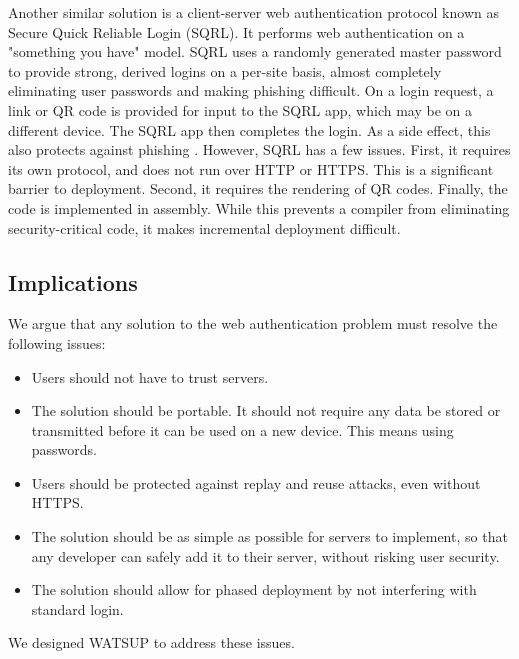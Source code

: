 Another similar solution is a client-server web authentication protocol known as Secure Quick Reliable Login (SQRL). It performs web authentication on a "something you have" model. SQRL uses a randomly generated master password to provide strong, derived logins on a per-site basis, almost completely eliminating user passwords and making phishing difficult. On a login request, a link or QR code is provided for input to the SQRL app, which may be on a different device. The SQRL app then completes the login. As a side effect, this also protects against phishing \cite{Gibson:2016}. However, SQRL has a few issues. First, it requires its own protocol, and does not run over HTTP or HTTPS. This is a significant barrier to deployment. Second, it requires the rendering of QR codes. Finally, the code is implemented in assembly. While this prevents a compiler from eliminating security-critical code, it makes incremental deployment difficult.

\subsection{Implications}
We argue that any solution to the web authentication problem must resolve the following issues:

\begin{itemize}

    \item Users should not have to trust servers.

    \item The solution should be portable. It should not require any data be stored or transmitted before it can be used on a new device. This means using passwords.

    \item Users should be protected against replay and reuse attacks, even without HTTPS.

    \item The solution should be as simple as possible for servers to implement, so that any developer can safely add it to their server, without risking user security.

    \item The solution should allow for phased deployment by not interfering with standard login.

\end{itemize}

\noindent We designed WATSUP to address these issues.
